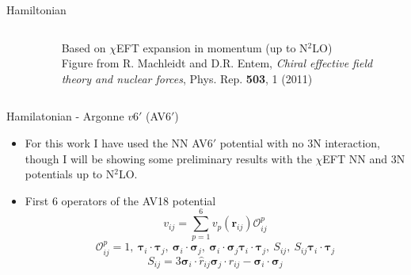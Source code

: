\documentclass{beamer}
\renewcommand{\r}{\mathbf{r}}
\newcommand{\ti}{\bm{\tau}_i}
\newcommand{\tj}{\bm{\tau}_j}
\newcommand{\si}{\bm{\sigma}_i}
\newcommand{\sj}{\bm{\sigma}_j}
\begin{document}
\begin{frame}{Hamiltonian}
\begin{columns}
\begin{column}{0.5\textwidth}
\begin{figure}
\end{figure}
\end{column}
\begin{column}{0.5\textwidth}
   Based on $\chi$EFT expansion in momentum (up to N$^2$LO)
   {\\ \tiny Figure from R. Machleidt and D.R. Entem, {\it Chiral effective field theory and nuclear forces}, Phys. Rep. {\bf 503}, 1 (2011)}
\end{column}
\end{columns}
\end{frame}

\begin{frame}{Hamilatonian - Argonne $v6'$ (AV6$'$)}
\begin{itemize}
   \item For this work I have used the NN AV6$'$ potential with no 3N interaction, though I will be showing some preliminary results with the $\chi$EFT NN and 3N potentials up to N$^2$LO.
   \item First 6 operators of the AV18 potential
   \begin{equation*}
      v_{ij} = \sum\limits_{p=1}^6 v_p(\r_{ij})\mathcal{O}^p_{ij}
   \end{equation*}
   \begin{equation*}
      \mathcal{O}^p_{ij} = 1,~\ti\cdot\tj,~\si\cdot\sj,~\si\cdot\sj\ti\cdot\tj,~S_{ij},~S_{ij}\ti\cdot\tj
   \end{equation*}
   \begin{equation*}
      S_{ij} = 3\si\cdot\hat{r}_{ij}\sj\cdot\hat{r}_{ij}-\si\cdot\sj
   \end{equation*}
\end{itemize}
\end{frame}
\end{document}

